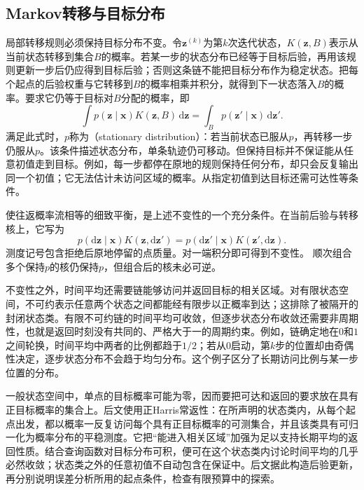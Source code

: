 \subsection{Markov转移与目标分布}
\label{sec:pgm-sampling-markov-kernel}

局部转移规则必须保持目标分布不变。令$\bm z^{(k)}$为第$k$次迭代状态，$K(\bm z,B)$表示从当前状态转移到集合$B$的概率。若某一步的状态分布已经等于目标后验，再用该规则更新一步后仍应得到目标后验；否则这条链不能把目标分布作为稳定状态。把每个起点的后验权重与它转移到$B$的概率相乘并积分，就得到下一状态落入$B$的概率。要求它仍等于目标对$B$分配的概率，即
\begin{equation}
  \int p(\bm{z}\mid\bm{x})K(\bm{z},B)\,\mathrm{d}\bm{z}
    =\int_B p(\bm{z}'\mid\bm{x})\,\mathrm{d}\bm{z}'.
  \label{eq:pgm-sampling-invariance}
\end{equation}
满足此式时，$p$称为（stationary distribution）：若当前状态已服从$p$，再转移一步仍服从$p$。该条件描述状态分布，单条轨迹仍可移动。但保持目标并不保证能从任意初值走到目标。例如，每一步都停在原地的规则保持任何分布，却只会反复输出同一个初值；它无法估计未访问区域的概率。从指定初值到达目标还需可达性等条件。

使往返概率流相等的细致平衡，是上述不变性的一个充分条件。在当前后验与转移核上，它写为
\begin{equation}
  p(\mathrm{d}\bm{z}\mid\bm{x})K(\bm{z},\mathrm{d}\bm{z}')
    =p(\mathrm{d}\bm{z}'\mid\bm{x})K(\bm{z}',\mathrm{d}\bm{z}).
  \label{eq:pgm-sampling-detailed-balance}
\end{equation}
测度记号包含拒绝后原地停留的点质量。对一端积分即可得到不变性。
顺次组合多个保持$p$的核仍保持$p$，但组合后的核未必可逆。

不变性之外，时间平均还需要链能够访问并返回目标的相关区域。对有限状态空间，不可约表示任意两个状态之间都能经有限步以正概率到达；这排除了被隔开的封闭状态类。有限不可约链的时间平均可收敛，但逐步状态分布收敛还需要非周期性，也就是返回时刻没有共同的、严格大于一的周期约束。例如，链确定地在$0$和$1$之间轮换，时间平均中两者的比例都趋于$1/2$；若从$0$启动，第$k$步的位置却由奇偶性决定，逐步状态分布不会趋于均匀分布。这个例子区分了长期访问比例与某一步位置的分布。

一般状态空间中，单点的目标概率可能为零，因而要把可达和返回的要求放在具有正目标概率的集合上。后文使用正Harris常返性：在所声明的状态类内，从每个起点出发，都以概率一反复访问每个具有正目标概率的可测集合，并且该类具有可归一化为概率分布的平稳测度。它把“能进入相关区域”加强为足以支持长期平均的返回性质。结合查询函数对目标分布可积，便可在这个状态类内讨论时间平均的几乎必然收敛；状态类之外的任意初值不自动包含在保证中。后文据此构造后验更新，再分别说明误差分析所用的起点条件，检查有限预算中的探索。

